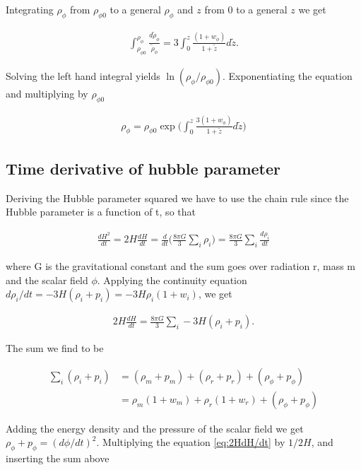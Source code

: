 \documentclass[a4paper,10pt]{article}
\begin{document}
Integrating $\rho_{\phi}$ from $\rho_{\phi0}$ to a general $\rho_{\phi}$ and $z$ from $0$ to a general $z$ we get

\begin{align}
\int_{\rho_{\phi 0}}^{\rho_{\phi}} \frac{d\tilde{\rho}_{\phi}}{\tilde{\rho}_{\phi}}  = 3 \int_0^z\frac{(1+w_{\phi})}{1+\tilde{z}} d\tilde{z}.
\end{align}

Solving the left hand integral yields $\ln(\rho_{\phi}/\rho_{\phi 0})$. Exponentiating the equation and multiplying by $\rho_{\phi 0}$

\begin{align}
\rho_{\phi} = \rho_{\phi 0} \exp\bigg( \int_0^z\frac{3(1+w_{\phi})}{1+\tilde{z}} d\tilde{z}\bigg)
\end{align}


\subsection{Time derivative of hubble parameter}
Deriving the Hubble parameter squared we have to use the chain rule since the Hubble parameter is a function of t, so that 

\begin{align*}
\frac{dH^2}{dt} = 2H\frac{dH}{dt} = \frac{d}{dt} \bigg(\frac{8\pi G}{3} \sum_i \rho_i\bigg) = \frac{8\pi G}{3} \sum_i \frac{d \rho_i}{dt}
\end{align*}

where G is the gravitational constant and the sum goes over radiation r, mass m and the scalar field $\phi$. Applying the continuity equation $d\rho_i/dt = -3H(\rho_i + p_i) = -3H\rho_i(1+w_i)$, we get

\begin{align}\label{eq:2HdH/dt}
2H\frac{dH}{dt} = \frac{8\pi G}{3} \sum_i -3H(\rho_i + p_i).
\end{align}

The sum we find to be

\begin{equation*}
\begin{split}
\sum_i (\rho_i + p_i) &= (\rho_m + p_m) + (\rho_r + p_r) + (\rho_{\phi} + p_{\phi}) \\
&= \rho_m(1 + w_m) + \rho_r(1+w_r) + (\rho_{\phi} + p_{\phi})
\end{split}
\end{equation*}

Adding the energy density and the pressure of the scalar field we get $\rho_{\phi} + p_{\phi} = (d\phi/dt)^2$. Multiplying the equation \eqref{eq:2HdH/dt} by $1/2H$, and inserting the sum above
\end{document}
